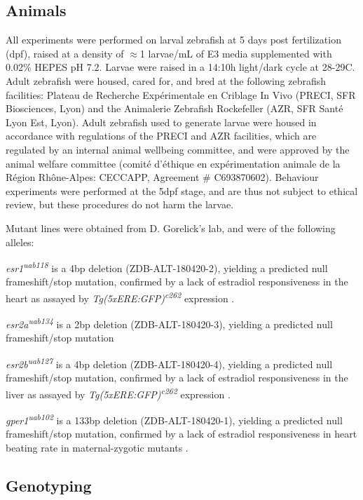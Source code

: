 \documentclass[9pt,lineno]{RandlettLab_elife}
\begin{document}
{\subsection{Animals}

All experiments were performed on larval zebrafish at 5 days post fertilization (dpf), raised at a density of $\approx$1 larvae/mL of E3 media supplemented with 0.02\% HEPES pH 7.2. 
Larvae were raised in a 14:10h light/dark cycle at 28-29\degree{}C. 
Adult zebrafish were housed, cared for, and bred at the following zebrafish facilities: Plateau de Recherche Expérimentale en Criblage In Vivo (PRECI, SFR Biosciences, Lyon) and the Animalerie Zebrafish Rockefeller (AZR, SFR Santé Lyon Est, Lyon). Adult zebrafish used to generate larvae were housed in accordance with regulations of the PRECI and AZR facilities, which are regulated by an internal animal wellbeing committee, and were approved by the animal welfare committee (comité d’éthique en expérimentation animale de la Région Rhône-Alpes: CECCAPP, Agreement \# C693870602). 
Behaviour experiments were performed at the 5dpf stage, and are thus not subject to ethical review, but these procedures do not harm the larvae. 

Mutant lines were obtained from D. Gorelick's lab, and were of the following alleles: 

\emph{esr1\textsuperscript{uab118}} is a 4bp deletion (ZDB-ALT-180420-2), yielding a predicted null frameshift/stop mutation, confirmed by a lack of estradiol responsiveness in the heart as assayed by \emph{Tg(5xERE:GFP)\textsuperscript{c262}} expression \citep{Romano2017-ep}. 

\emph{esr2a\textsuperscript{uab134}} is a 2bp deletion (ZDB-ALT-180420-3), yielding a predicted null frameshift/stop mutation \citep{Romano2017-ep}

\emph{esr2b\textsuperscript{uab127}} is a 4bp deletion (ZDB-ALT-180420-4), yielding a predicted null frameshift/stop mutation, confirmed by a lack of estradiol responsiveness in the liver as assayed by \emph{Tg(5xERE:GFP)\textsuperscript{c262}} expression \citep{Romano2017-ep}. 

\emph{gper1\textsuperscript{uab102}} is a 133bp deletion (ZDB-ALT-180420-1), yielding a predicted null frameshift/stop mutation, confirmed by a lack of estradiol responsiveness in heart beating rate in maternal-zygotic mutants \citep{Romano2017-ep}.

\subsection{Genotyping}

}
\end{document}
